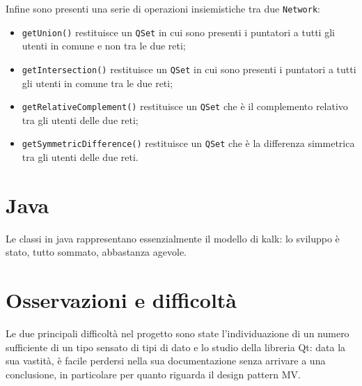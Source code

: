 Infine sono presenti una serie di operazioni insiemistiche tra due \texttt{Network}: 
\begin{itemize}
    \item \texttt{getUnion()} restituisce un \texttt{QSet} in cui sono presenti i puntatori a tutti gli utenti
    in comune e non tra le due reti;
    \item \texttt{getIntersection()} restituisce un \texttt{QSet} in cui sono presenti i puntatori a tutti gli 
    utenti in comune tra le due reti;
    \item \texttt{getRelativeComplement()} restituisce un \texttt{QSet} che è il complemento relativo tra gli utenti 
    delle due reti;
    \item \texttt{getSymmetricDifference()} restituisce un \texttt{QSet} che è la differenza simmetrica tra gli utenti
    delle due reti.
\end{itemize}


\section{Java}
Le classi in java rappresentano essenzialmente il modello di kalk: lo sviluppo è stato, tutto sommato, abbastanza agevole.

\section{Osservazioni e difficoltà}
Le due principali difficoltà nel progetto sono state l'individuazione di un numero sufficiente di un tipo sensato di 
tipi di dato e lo studio della libreria Qt: data la sua vastità, è facile perdersi nella sua documentazione senza
arrivare a una conclusione, in particolare per quanto riguarda il design pattern MV.



